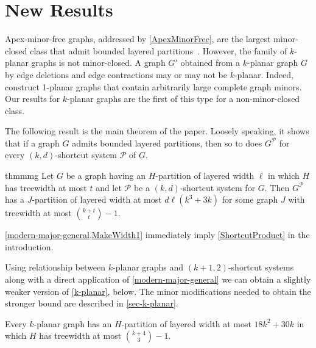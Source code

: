 \documentclass{patmorin}
\newcommand{\PP}{\mathcal{P}}
\renewcommand{\leq}{\leqslant}
\newcommand{\treewidth}{\ensuremath{\binom{k+4}{3}}-1}
\begin{document}
\section{New Results}

Apex-minor-free graphs, addressed by \cref{ApexMinorFree}, are the largest minor-closed class that admit bounded layered partitions~\citep{dujmovic.joret.ea:planar}. However, the family of $k$-planar graphs is not minor-closed.  A graph $G'$ obtained from a $k$-planar graph $G$ by edge deletions and edge contractions may or may not be $k$-planar. Indeed, \citet{dujmovic.eppstein.ea:structure} construct 1-planar graphs that contain arbitrarily large complete graph minors. Our results for $k$-planar graphs are the first of this type for a non-minor-closed class. 

The following result is the main theorem of the paper. Loosely speaking, it shows that if a graph $G$ admits bounded layered partitions, then so to does $G^\PP$ for every $(k,d)$-shortcut system $\PP$ of $G$. 

\begin{restatable}{thm}{mmg}
  \label{modern-major-general}
    Let $G$ be a graph having an $H$-partition of layered width $\ell$ in which $H$ has treewidth at most $t$ and let $\PP$ be a $(k,d)$-shortcut system for $G$.  Then $G^\PP$ has a $J$-partition of layered width at most $d\ell(k^3+3k)$ for some graph $J$ with treewidth at most $\binom{k+t}{t}-1$.
\end{restatable}

\cref{modern-major-general,MakeWidth1} immediately imply \cref{ShortcutProduct} in the introduction. 

Using relationship between $k$-planar graphs and $(k+1,2)$-shortcut systems along with a direct application of \cref{modern-major-general} we can obtain a slightly weaker version of \cref{k-planar}, below. The minor modifications needed to obtain the stronger bound are described in \cref{sec-k-planar}. 


\begin{thm}
\label{k-planar}
Every $k$-planar graph has an $H$-partition of layered width at most $18k^2 + 30k$ in which $H$ has treewidth at most $\binom{k+4}{3}-1$. %
\end{thm}
\end{document}
